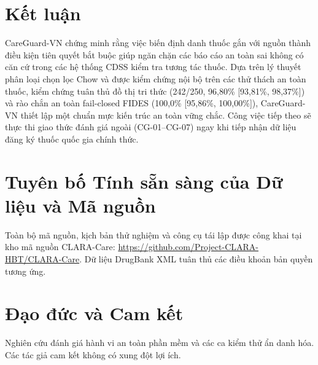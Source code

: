 \documentclass[11pt]{article}
\newcommand{\repo}{\url{https://github.com/Project-CLARA-HBT/CLARA-Care}}
\begin{document}
\section{Kết luận}
CareGuard-VN chứng minh rằng việc biến định danh thuốc gắn với nguồn thành điều kiện tiên quyết bắt buộc giúp ngăn chặn các báo cáo an toàn sai không có căn cứ trong các hệ thống CDSS kiểm tra tương tác thuốc. Dựa trên lý thuyết phân loại chọn lọc Chow và được kiểm chứng nội bộ trên các thử thách an toàn thuốc, kiểm chứng tuân thủ đồ thị tri thức (242/250, 96,80\% [93,81\%, 98,37\%]) và rào chắn an toàn fail-closed FIDES (100,0\% [95,86\%, 100,00\%]), CareGuard-VN thiết lập một chuẩn mực kiến trúc an toàn vững chắc. Công việc tiếp theo sẽ thực thi giao thức đánh giá ngoài (CG-01--CG-07) ngay khi tiếp nhận dữ liệu đăng ký thuốc quốc gia chính thức.

\section*{Tuyên bố Tính sẵn sàng của Dữ liệu và Mã nguồn}
Toàn bộ mã nguồn, kịch bản thử nghiệm và công cụ tái lập được công khai tại kho mã nguồn CLARA-Care: \repo. Dữ liệu DrugBank XML tuân thủ các điều khoản bản quyền tương ứng.

\section*{Đạo đức và Cam kết}
Nghiên cứu đánh giá hành vi an toàn phần mềm và các ca kiểm thử ẩn danh hóa. Các tác giả cam kết không có xung đột lợi ích.
\end{document}
